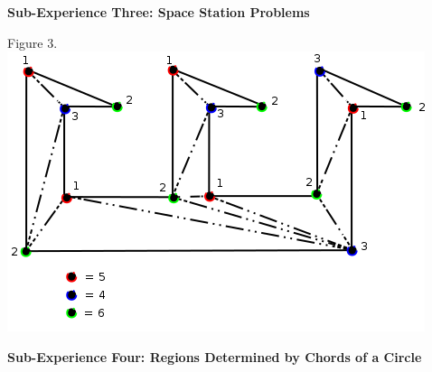 \documentclass[10pt,a4paper]{report}
\begin{document}
		
	\textbf{Sub-Experience Three: Space Station Problems}\\
	
		\begin{center}
			Figure 3.\\
			\includegraphics[scale=.5]{e3.png}
			\newline
			\newline
		\end{center}
	\textbf{Sub-Experience Four: Regions Determined by Chords of a Circle}\\
	
\end{document}
